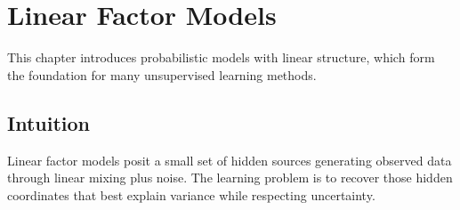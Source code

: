 
\chapter{Linear Factor Models}
\label{chap:linear-factor-models}

This chapter introduces probabilistic models with linear structure, which form the foundation for many unsupervised learning methods.


\begin{learningobjectives}
\end{learningobjectives}



\section*{Intuition}

Linear factor models posit a small set of hidden sources generating observed data through linear mixing plus noise. The learning problem is to recover those hidden coordinates that best explain variance while respecting uncertainty.











